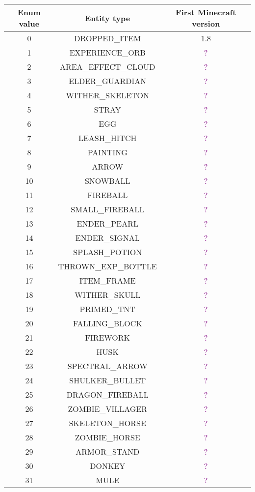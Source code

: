 \documentclass[11pt]{article}
\newcommand\myworries[1]{\textcolor{purple}{#1}}
\begin{document}
\begin{longtable}{ |c|c|c| }
\hline
Enum value & Entity type & First Minecraft version \\
\hline
\endhead
	0 & DROPPED\_ITEM & 1.8 \\
	1 & EXPERIENCE\_ORB & \myworries{?} \\
	2 & AREA\_EFFECT\_CLOUD & \myworries{?} \\
	3 & ELDER\_GUARDIAN & \myworries{?} \\
	4 & WITHER\_SKELETON & \myworries{?} \\
	5 & STRAY & \myworries{?} \\
	6 & EGG & \myworries{?} \\
	7 & LEASH\_HITCH & \myworries{?} \\
	8 & PAINTING & \myworries{?} \\
	9 & ARROW & \myworries{?} \\
	10 & SNOWBALL & \myworries{?} \\
	11 & FIREBALL & \myworries{?} \\
	12 & SMALL\_FIREBALL & \myworries{?} \\
	13 & ENDER\_PEARL & \myworries{?} \\
	14 & ENDER\_SIGNAL & \myworries{?} \\
	15 & SPLASH\_POTION & \myworries{?} \\
	16 & THROWN\_EXP\_BOTTLE & \myworries{?} \\
	17 & ITEM\_FRAME & \myworries{?} \\
	18 & WITHER\_SKULL & \myworries{?} \\
	19 & PRIMED\_TNT & \myworries{?} \\
	20 & FALLING\_BLOCK & \myworries{?} \\
	21 & FIREWORK & \myworries{?} \\
	22 & HUSK & \myworries{?} \\
	23 & SPECTRAL\_ARROW & \myworries{?} \\
	24 & SHULKER\_BULLET & \myworries{?} \\
	25 & DRAGON\_FIREBALL & \myworries{?} \\
	26 & ZOMBIE\_VILLAGER & \myworries{?} \\
	27 & SKELETON\_HORSE & \myworries{?} \\
	28 & ZOMBIE\_HORSE & \myworries{?} \\
	29 & ARMOR\_STAND & \myworries{?} \\
	30 & DONKEY & \myworries{?} \\
	31 & MULE & \myworries{?} \\

\end{longtable}
\end{document}
